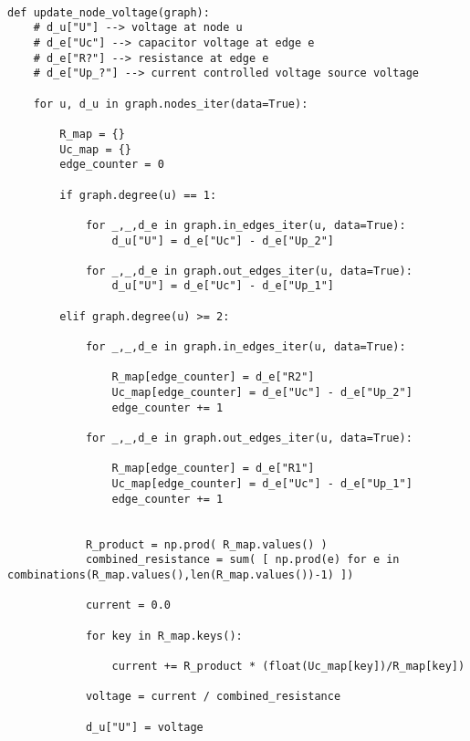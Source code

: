 \begin{codesnippet}
\begin{verbatim}

def update_node_voltage(graph):
	# d_u["U"] --> voltage at node u
	# d_e["Uc"] --> capacitor voltage at edge e
	# d_e["R?"] --> resistance at edge e
	# d_e["Up_?"] --> current controlled voltage source voltage

	for u, d_u in graph.nodes_iter(data=True):
			
		R_map = {}
		Uc_map = {}
		edge_counter = 0

		if graph.degree(u) == 1:

			for _,_,d_e in graph.in_edges_iter(u, data=True):
				d_u["U"] = d_e["Uc"] - d_e["Up_2"]

			for _,_,d_e in graph.out_edges_iter(u, data=True):
				d_u["U"] = d_e["Uc"] - d_e["Up_1"]

		elif graph.degree(u) >= 2:

			for _,_,d_e in graph.in_edges_iter(u, data=True):

				R_map[edge_counter] = d_e["R2"]
				Uc_map[edge_counter] = d_e["Uc"] - d_e["Up_2"]
				edge_counter += 1

			for _,_,d_e in graph.out_edges_iter(u, data=True):

				R_map[edge_counter] = d_e["R1"]
				Uc_map[edge_counter] = d_e["Uc"] - d_e["Up_1"]
				edge_counter += 1


			R_product = np.prod( R_map.values() )
			combined_resistance = sum( [ np.prod(e) for e in combinations(R_map.values(),len(R_map.values())-1) ])

			current = 0.0

			for key in R_map.keys():

				current += R_product * (float(Uc_map[key])/R_map[key])

			voltage = current / combined_resistance
		
			d_u["U"] = voltage

\end{verbatim}
\label{code:node_voltage}
\end{codesnippet}


